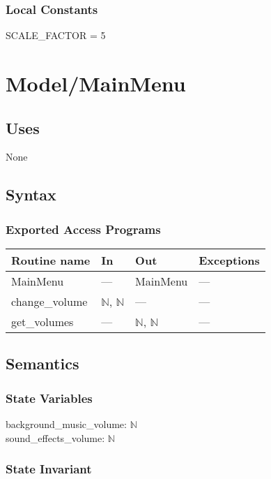 \documentclass[12pt]{article}
\begin{document}
\subsubsection* {Local Constants}
SCALE\_FACTOR = 5

\newpage
\section*{Model/MainMenu}

\subsection* {Uses}
None

\subsection* {Syntax}

\subsubsection* {Exported Access Programs}

\begin{tabular}{| l | l | l | l |}
\hline
\textbf{Routine name} & \textbf{In} & \textbf{Out} & \textbf{Exceptions}\\
\hline
    MainMenu & --- & MainMenu & ---\\
\hline
    change\_volume & $\mathbb{N}$, $\mathbb{N}$ & --- & ---\\
\hline
    get\_volumes & --- & $\mathbb{N}$, $\mathbb{N}$ & ---\\
\hline
\end{tabular}

\subsection* {Semantics}

\subsubsection* {State Variables}

background\_music\_volume: $\mathbb{N}$\\
sound\_effects\_volume: $\mathbb{N}$

\subsubsection* {State Invariant}
\end{document}
